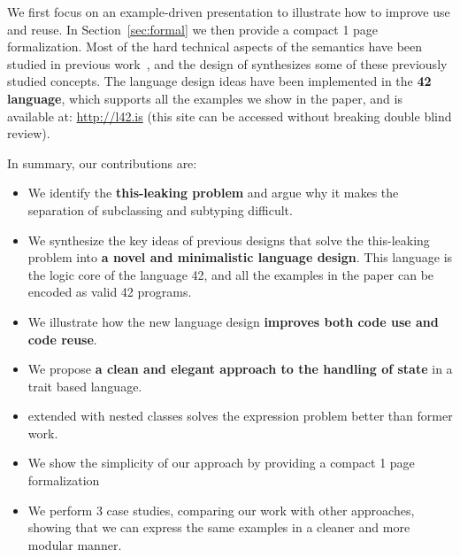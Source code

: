 We first focus on an example-driven presentation to illustrate how to
improve use and reuse. 
In Section~\ref{sec:formal} we then provide a compact 1 page formalization.
Most of the hard technical aspects of the
semantics have been studied in previous 
work~\cite{Bettini:2010:ISP:1774088.1774530,BETTINI2013521,Bettini2015282,KrogdahlMS09,DBLP:journals/taosd/AxelsenSKM12,DBLP:conf/gpce/AxelsenK12,deep,servetto2014meta,fjig},
and the design of \name synthesizes some of these previously studied
concepts.
The language design ideas have been implemented in the {\bf 42 language}, which supports all
the examples we show in the paper, and is available at: \url{http://l42.is} (this site can be accessed without breaking double blind review).

In summary, our contributions are:







\begin{itemize}
\item We identify the {\bf this-leaking problem} and argue why it
  makes the separation of subclassing and subtyping difficult.
\item We synthesize the key ideas of previous designs that solve the
  this-leaking problem into {\bf a novel and
  minimalistic language design}. This language is the logic core of the language 42, and 
  all the examples in the paper can be encoded as valid 42 programs. 

\item We illustrate how the new language design {\bf improves both code use and code
  reuse}.
\item We propose {\bf a clean and elegant approach to the handling of state} in a trait based language.

\item \name extended with nested classes solves the expression problem better than former work.
\item We show the simplicity of our approach by providing a compact 1 page formalization
\item We perform 3 case studies, comparing our work with other approaches, showing that we can express the same examples in a cleaner and more modular manner.
\end{itemize}
\saveSpace
\saveSpace

